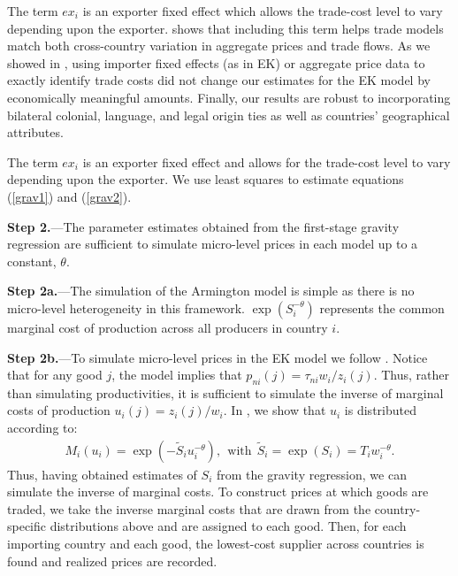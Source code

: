 \documentclass[12pt,dvips, ps2pdf]{article}
\begin{document}
The term $ex_i$ is an exporter fixed effect which allows the trade-cost level to vary depending
upon the exporter. \citet{waugh} shows that including this term helps trade models match
both cross-country variation in aggregate prices and trade flows. As we showed in \citet{sw_jie}, using importer fixed effects (as in EK) or aggregate price data to exactly identify trade costs did not change our estimates for the EK model by economically meaningful amounts. Finally, our results are robust to incorporating bilateral colonial, language, and legal origin ties as well as countries' geographical attributes.

The term $ex_i$ is an exporter fixed effect and allows for the trade-cost level to vary depending upon the exporter.  We use least squares to estimate equations (\ref{grav1}) and (\ref{grav2}).

\textbf{Step 2.}---The parameter estimates obtained from the first-stage gravity regression are sufficient to simulate micro-level prices in each model up to a constant, $\theta$.

\textbf{Step 2a.}---The simulation of the Armington model is simple as there is no micro-level heterogeneity in this framework. $\exp (S_i^{-\theta})$ represents the common marginal cost of production across all producers in country $i$.

\textbf{Step 2b.}---To simulate micro-level prices in the EK model we follow \citet{sw_jie}. Notice that for any good $j$, the model implies that $p_{ni}(j)=\tau_{ni}w_i/z_i(j)$. Thus, rather than simulating productivities, it is sufficient to simulate the inverse of marginal costs of production $u_i(j)=z_i(j)/w_i$. In \citet{sw_jie}, we show that $u_i$ is distributed according to:
\begin{eqnarray}
M_i(u_i)=\exp\left(-\tilde{S}_iu_i^{-\theta}\right), \ \ \mbox{with} \ \ \tilde{S}_i =\exp(S_i) = T_i w_i^{-\theta}.
\label{inv_mc}
\end{eqnarray}
Thus, having obtained estimates of $ S_i$ from the gravity regression, we can simulate the inverse of marginal costs. To construct prices at which goods are traded, we take the inverse marginal costs that are drawn from the country-specific distributions above and are assigned to each good. Then, for each importing country and each good, the lowest-cost supplier across countries is found and realized prices are recorded.
\end{document}
